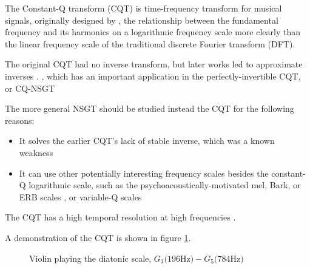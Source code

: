 \documentclass[report.tex]{subfiles}
\begin{document}

The Constant-Q transform (CQT) is time-frequency transform for musical signals, originally designed by \textcite{jbrown}, the relationship between the fundamental frequency and its harmonics on a logarithmic frequency scale more clearly than the linear frequency scale of the traditional discrete Fourier transform (DFT).

The original CQT had no inverse transform, but later works led to approximate inverses \cite{klapuricqt, fitzgeraldcqt}. 
, which has an important application in the perfectly-invertible CQT, or CQ-NSGT \cite{invertiblecqt}

The more general NSGT should be studied instead the CQT for the following reasons:
\begin{itemize}
	\item
		It solves the earlier CQT's \cite{jbrown, klapuricqt, fitzgeraldcqt} lack of stable inverse, which was a known weakness \cite{lackinverse}
	\item
		It can use other potentially interesting frequency scales besides the constant-Q logarithmic scale, such as the psychoacoustically-motivated mel, Bark, or ERB scales , or variable-Q scales 
\end{itemize}

 The CQT has a high temporal resolution at high frequencies \cite{cqtransient} .

 A demonstration of the CQT is shown in figure \ref{fig:earlycqt}.

\begin{figure}[ht]
	\centering
	\caption{Violin playing the diatonic scale, $G_{3} \text{(196Hz)} - G_{5} \text{(784Hz)}$}
	\label{fig:earlycqt}
\end{figure}
\end{document}
